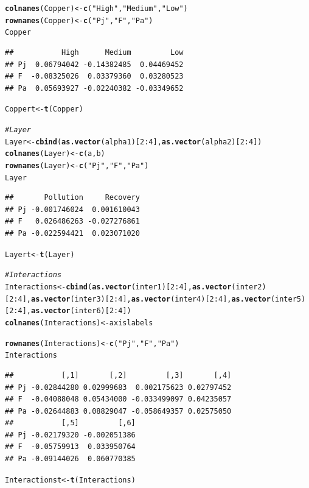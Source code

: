 \documentclass{article}\usepackage[]{graphicx}\usepackage[]{color}
\makeatletter
\newcommand{\hlnum}[1]{\textcolor[rgb]{0.686,0.059,0.569}{#1}}%
\newcommand{\hlstr}[1]{\textcolor[rgb]{0.192,0.494,0.8}{#1}}%
\newcommand{\hlcom}[1]{\textcolor[rgb]{0.678,0.584,0.686}{\textit{#1}}}%
\newcommand{\hlopt}[1]{\textcolor[rgb]{0,0,0}{#1}}%
\newcommand{\hlstd}[1]{\textcolor[rgb]{0.345,0.345,0.345}{#1}}%
\newcommand{\hlkwb}[1]{\textcolor[rgb]{0.69,0.353,0.396}{#1}}%
\newcommand{\hlkwd}[1]{\textcolor[rgb]{0.737,0.353,0.396}{\textbf{#1}}}%
\newenvironment{kframe}{%
 \def\at@end@of@kframe{}%
 \ifinner\ifhmode%
  \def\at@end@of@kframe{\end{minipage}}%
  \begin{minipage}{\columnwidth}%
 \fi\fi%
 \def\FrameCommand##1{\hskip\@totalleftmargin \hskip-\fboxsep
 \colorbox{shadecolor}{##1}\hskip-\fboxsep
     \hskip-\linewidth \hskip-\@totalleftmargin \hskip\columnwidth}%
 \MakeFramed {\advance\hsize-\width
   \@totalleftmargin\z@ \linewidth\hsize
   \@setminipage}}%
 {\par\unskip\endMakeFramed%
 \at@end@of@kframe}
\newenvironment{knitrout}{}{} %
\makeatother
\begin{document}
\begin{knitrout}
\begin{kframe}
\begin{alltt}
\hlkwd{colnames}\hlstd{(Copper)} \hlkwb{<-} \hlkwd{c}\hlstd{(}\hlstr{"High"}\hlstd{,} \hlstr{"Medium"}\hlstd{,} \hlstr{"Low"}\hlstd{)}
\hlkwd{rownames}\hlstd{(Copper)} \hlkwb{<-} \hlkwd{c}\hlstd{(}\hlstr{"Pj"}\hlstd{,} \hlstr{"F"}\hlstd{,} \hlstr{"Pa"}\hlstd{)}
\hlstd{Copper}
\end{alltt}
\begin{verbatim}
##           High      Medium         Low
## Pj  0.06794042 -0.14382485  0.04469452
## F  -0.08325026  0.03379360  0.03280523
## Pa  0.05693927 -0.02240382 -0.03349652
\end{verbatim}
\begin{alltt}
\hlstd{Coppert}\hlkwb{<-}\hlkwd{t}\hlstd{(Copper)}

\hlcom{#Layer}
\hlstd{Layer} \hlkwb{<-} \hlkwd{cbind}\hlstd{(}\hlkwd{as.vector}\hlstd{(alpha1)[}\hlnum{2}\hlopt{:}\hlnum{4}\hlstd{],} \hlkwd{as.vector}\hlstd{(alpha2)[}\hlnum{2}\hlopt{:}\hlnum{4}\hlstd{])}
\hlkwd{colnames}\hlstd{(Layer)} \hlkwb{<-} \hlkwd{c}\hlstd{(a, b)}
\hlkwd{rownames}\hlstd{(Layer)} \hlkwb{<-} \hlkwd{c}\hlstd{(}\hlstr{"Pj"}\hlstd{,} \hlstr{"F"}\hlstd{,} \hlstr{"Pa"}\hlstd{)}
\hlstd{Layer}
\end{alltt}
\begin{verbatim}
##       Pollution     Recovery
## Pj -0.001746024  0.001610043
## F   0.026486263 -0.027276861
## Pa -0.022594421  0.023071020
\end{verbatim}
\begin{alltt}
\hlstd{Layert}\hlkwb{<-}\hlkwd{t}\hlstd{(Layer)}

\hlcom{#Interactions}
\hlstd{Interactions} \hlkwb{<-} \hlkwd{cbind}\hlstd{(}\hlkwd{as.vector}\hlstd{(inter1)[}\hlnum{2}\hlopt{:}\hlnum{4}\hlstd{],} \hlkwd{as.vector}\hlstd{(inter2)[}\hlnum{2}\hlopt{:}\hlnum{4}\hlstd{],} \hlkwd{as.vector}\hlstd{(inter3)[}\hlnum{2}\hlopt{:}\hlnum{4}\hlstd{],} \hlkwd{as.vector}\hlstd{(inter4)[}\hlnum{2}\hlopt{:}\hlnum{4}\hlstd{],} \hlkwd{as.vector}\hlstd{(inter5)[}\hlnum{2}\hlopt{:}\hlnum{4}\hlstd{],} \hlkwd{as.vector}\hlstd{(inter6)[}\hlnum{2}\hlopt{:}\hlnum{4}\hlstd{])}
\hlkwd{colnames}\hlstd{(Interactions)} \hlkwb{<-} \hlstd{axislabels}
\end{alltt}


{\ttfamily\noindent\bfseries\color{errorcolor}{\#\# Error in eval(expr, envir, enclos): object 'axislabels' not found}}\begin{alltt}
\hlkwd{rownames}\hlstd{(Interactions)} \hlkwb{<-} \hlkwd{c}\hlstd{(}\hlstr{"Pj"}\hlstd{,} \hlstr{"F"}\hlstd{,} \hlstr{"Pa"}\hlstd{)}
\hlstd{Interactions}
\end{alltt}
\begin{verbatim}
##           [,1]       [,2]         [,3]       [,4]
## Pj -0.02844280 0.02999683  0.002175623 0.02797452
## F  -0.04088048 0.05434000 -0.033499097 0.04235057
## Pa -0.02644883 0.08829047 -0.058649357 0.02575050
##           [,5]         [,6]
## Pj -0.02179320 -0.002051386
## F  -0.05759913  0.033950764
## Pa -0.09144026  0.060770385
\end{verbatim}
\begin{alltt}
\hlstd{Interactionst}\hlkwb{<-}\hlkwd{t}\hlstd{(Interactions)}


\end{alltt}
\end{kframe}
\end{knitrout}
\end{document}
